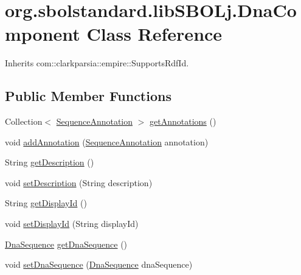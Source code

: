 \hypertarget{classorg_1_1sbolstandard_1_1lib_s_b_o_lj_1_1_dna_component}{
\section{org.sbolstandard.libSBOLj.DnaComponent Class Reference}
\label{classorg_1_1sbolstandard_1_1lib_s_b_o_lj_1_1_dna_component}
}


Inherits com::clarkparsia::empire::SupportsRdfId.

\subsection*{Public Member Functions}
\begin{DoxyCompactItemize}
\item 
Collection$<$ \hyperlink{classorg_1_1sbolstandard_1_1lib_s_b_o_lj_1_1_sequence_annotation}{SequenceAnnotation} $>$ \hyperlink{classorg_1_1sbolstandard_1_1lib_s_b_o_lj_1_1_dna_component_a3e79a9ba42823f8fb76cb5a7acc30a25}{getAnnotations} ()
\item 
void \hyperlink{classorg_1_1sbolstandard_1_1lib_s_b_o_lj_1_1_dna_component_a204c63e01c40b72405a339be55a4c609}{addAnnotation} (\hyperlink{classorg_1_1sbolstandard_1_1lib_s_b_o_lj_1_1_sequence_annotation}{SequenceAnnotation} annotation)
\item 
String \hyperlink{classorg_1_1sbolstandard_1_1lib_s_b_o_lj_1_1_dna_component_aa6dd4476913f41b504a5d287384d1f38}{getDescription} ()
\item 
void \hyperlink{classorg_1_1sbolstandard_1_1lib_s_b_o_lj_1_1_dna_component_a3e1a97df49a463c10e86e3fd9f9ec736}{setDescription} (String description)
\item 
String \hyperlink{classorg_1_1sbolstandard_1_1lib_s_b_o_lj_1_1_dna_component_ab0ce1dc35a70c136ca8f5254c3e79f7f}{getDisplayId} ()
\item 
void \hyperlink{classorg_1_1sbolstandard_1_1lib_s_b_o_lj_1_1_dna_component_a23e4982b43cd5a2b868c21a78ce0a9ee}{setDisplayId} (String displayId)
\item 
\hyperlink{classorg_1_1sbolstandard_1_1lib_s_b_o_lj_1_1_dna_sequence}{DnaSequence} \hyperlink{classorg_1_1sbolstandard_1_1lib_s_b_o_lj_1_1_dna_component_aaee003e62666244972b2a0c872a85663}{getDnaSequence} ()
\item 
void \hyperlink{classorg_1_1sbolstandard_1_1lib_s_b_o_lj_1_1_dna_component_a33338268a8d859ea2fd892cabdc3b033}{setDnaSequence} (\hyperlink{classorg_1_1sbolstandard_1_1lib_s_b_o_lj_1_1_dna_sequence}{DnaSequence} dnaSequence)

\end{DoxyCompactItemize}
